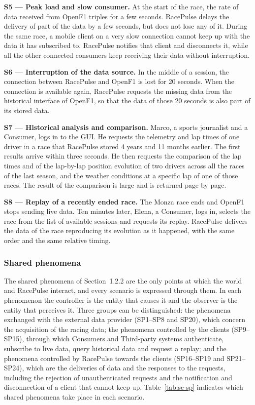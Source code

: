 \documentclass[11pt,a4paper]{article}
\newcommand{\RP}{RacePulse}
\begin{document}
\textbf{S5 --- Peak load and slow consumer.} At the start of the race, the rate of data received from OpenF1
triples for a few seconds. \RP{} delays the delivery of part of the data by a few seconds, but does not lose any of
it. During the same race, a mobile client on a very slow connection cannot keep up with the data it has subscribed
to. \RP{} notifies that client and disconnects it, while all the other connected consumers keep receiving their
data without interruption.

\textbf{S6 --- Interruption of the data source.} In the middle of a session, the connection between \RP{} and
OpenF1 is lost for 20 seconds. When the connection is available again, \RP{} requests the missing data from the
historical interface of OpenF1, so that the data of those 20 seconds is also part of its stored data.

\textbf{S7 --- Historical analysis and comparison.} Marco, a sports journalist and a Consumer, logs in to the GUI.
He requests the telemetry and lap times of one driver in a race that \RP{} stored 4 years and 11 months earlier.
The first results arrive within three seconds. He then requests the comparison of the lap times and of the
lap-by-lap position evolution of two drivers across all the races of the last season, and the weather conditions at
a specific lap of one of those races. The result of the comparison is large and is returned page by page.

\textbf{S8 --- Replay of a recently ended race.} The Monza race ends and OpenF1 stops sending live data. Ten
minutes later, Elena, a Consumer, logs in, selects the race from the list of available sessions and requests its
replay. \RP{} delivers the data of the race reproducing its evolution as it happened, with the same order and the
same relative timing.

\subsubsection{Shared phenomena}
The shared phenomena of Section~1.2.2 are the only points at which the world and \RP{} interact, and every
scenario is expressed through them. In each phenomenon the controller is the entity that causes it and the
observer is the entity that perceives it. Three groups can be distinguished: the phenomena exchanged with the
external data provider (SP1--SP8 and SP20), which concern the acquisition of the racing data; the phenomena
controlled by the clients (SP9--SP15), through which Consumers and Third-party systems authenticate, subscribe
to live data, query historical data and request a replay; and the phenomena controlled by \RP{} towards the
clients (SP16--SP19 and SP21--SP24), which are the deliveries of data and the responses to the requests, including
the rejection of unauthenticated requests and the notification and disconnection of a client that cannot keep up.
Table~\ref{tab:sc-sp} indicates which shared phenomena take place in each scenario.
\end{document}
